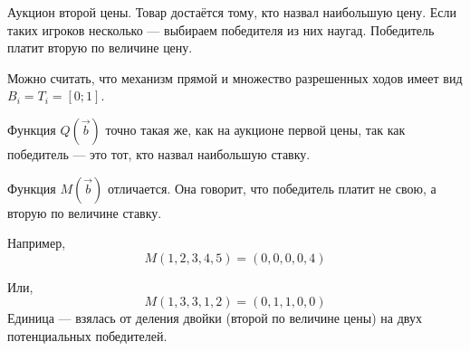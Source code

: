 \begin{myex} Аукцион второй цены. Товар достаётся тому, кто назвал наибольшую цену. Если таких игроков несколько — выбираем победителя из них наугад. Победитель платит вторую по величине цену.

Можно считать, что механизм прямой и множество разрешенных ходов имеет вид $B_{i}=T_{i}=[0;1] $.

Функция $ Q(\vec{b}) $ точно такая же, как на аукционе первой цены, так как победитель — это тот, кто назвал наибольшую ставку.

Функция $ M(\vec{b}) $ отличается. Она говорит, что победитель платит не свою, а вторую по величине ставку.

Например,
\begin{equation}
M(1,2,3,4,5)=(0,0,0,0,4)
\end{equation}

Или,
\begin{equation}
M(1,3,3,1,2)=(0,1,1,0,0)
\end{equation}
Единица — взялась от деления двойки (второй по величине цены) на двух потенциальных победителей.

\end{myex}

